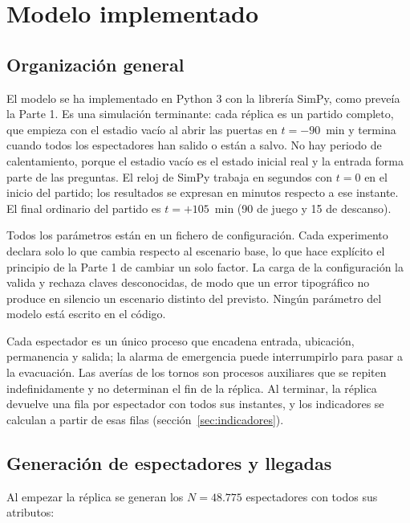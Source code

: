 \section{Modelo implementado}\label{sec:modelo}

\subsection{Organización general}

El modelo se ha implementado en Python 3 con la librería SimPy, como preveía la
Parte 1. Es una simulación terminante: cada réplica es un partido completo, que
empieza con el estadio vacío al abrir las puertas en $t=-90$~min y termina
cuando todos los espectadores han salido o están a salvo. No hay periodo de
calentamiento, porque el estadio vacío es el estado inicial real y la entrada
forma parte de las preguntas. El reloj de SimPy trabaja en segundos con $t=0$ en
el inicio del partido; los resultados se expresan en minutos respecto a ese
instante. El final ordinario del partido es $t=+105$~min (90 de juego y 15 de
descanso).

Todos los parámetros están en un fichero de configuración. Cada experimento
declara solo lo que cambia respecto al escenario base, lo que hace explícito el
principio de la Parte 1 de cambiar un solo factor. La carga de la configuración
la valida y rechaza claves desconocidas, de modo que un error tipográfico no
produce en silencio un escenario distinto del previsto. Ningún parámetro del
modelo está escrito en el código.

Cada espectador es un único proceso que encadena entrada, ubicación,
permanencia y salida; la alarma de emergencia puede interrumpirlo para pasar a
la evacuación. Las averías de los tornos son procesos auxiliares que se repiten
indefinidamente y no determinan el fin de la réplica. Al terminar, la réplica
devuelve una fila por espectador con todos sus instantes, y los indicadores se
calculan a partir de esas filas (sección~\ref{sec:indicadores}).

\subsection{Generación de espectadores y llegadas}

Al empezar la réplica se generan los $N=48.775$ espectadores con todos sus
atributos:

